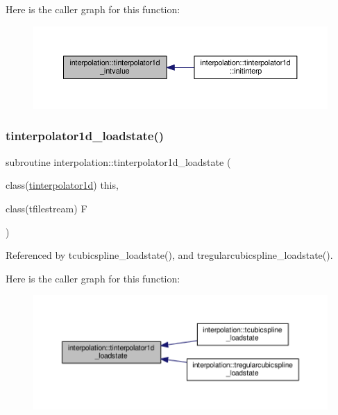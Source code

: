 Here is the caller graph for this function\+:
\nopagebreak
\begin{figure}[H]
\begin{center}
\leavevmode
\includegraphics[width=350pt]{namespaceinterpolation_a8b3767144728c4ff1d5564b16b2b2e97_icgraph}
\end{center}
\end{figure}
\mbox{\label{namespaceinterpolation_a08169c4a9ace8a6318b3853d0bd9c084}} 
\subsubsection{\texorpdfstring{tinterpolator1d\+\_\+loadstate()}{tinterpolator1d\_loadstate()}}
{\footnotesize\ttfamily subroutine interpolation\+::tinterpolator1d\+\_\+loadstate (\begin{DoxyParamCaption}\item[{class(\mbox{\hyperlink{structinterpolation_1_1tinterpolator1d}{tinterpolator1d}})}]{this,  }\item[{class(tfilestream)}]{F }\end{DoxyParamCaption})}



Referenced by tcubicspline\+\_\+loadstate(), and tregularcubicspline\+\_\+loadstate().

Here is the caller graph for this function\+:
\nopagebreak
\begin{figure}[H]
\begin{center}
\leavevmode
\includegraphics[width=350pt]{namespaceinterpolation_a08169c4a9ace8a6318b3853d0bd9c084_icgraph}
\end{center}
\end{figure}
\mbox{\label{namespaceinterpolation_a2e4b0cd2e1a31f06c7202669b574df13}} 
